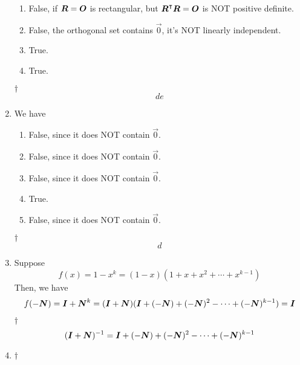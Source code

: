 \documentclass[a4paper,12pt]{article}
\begin{document}
\begin{enumerate}
\begin{enumerate}[label=(\alph*)]
        \item False, if $\boldsymbol{R} = \boldsymbol{O}$ is rectangular, but $\boldsymbol{R}^\intercal\boldsymbol{R} = \boldsymbol{O}$ is NOT positive definite.
        \item False, the orthogonal set contains $\vec{0}$, it's NOT linearly independent.
        \item True.
        \item True.
    \end{enumerate}
    \begin{answer}{$\dag$}\begin{equation}
            de       
        \end{equation}
    \end{answer}
    \item We have \begin{enumerate}[label=(\alph*)]
        \item False, since it does NOT contain $\vec{0}$.
        \item False, since it does NOT contain $\vec{0}$.
        \item False, since it does NOT contain $\vec{0}$.
        \item True.
        \item False, since it does NOT contain $\vec{0}$.
    \end{enumerate}
    \begin{answer}{$\dag$}\begin{equation}
            d        
        \end{equation}
    \end{answer}
    \item Suppose \begin{equation}
        f(x) = 1 - x^k = (1 - x)(1 + x + x^2 + \cdots + x^{k - 1})
    \end{equation} Then, we have \begin{equation}
        f(-\boldsymbol{N}) = \boldsymbol{I} + \boldsymbol{N}^k = (\boldsymbol{I} + \boldsymbol{N})(\boldsymbol{I} + (-\boldsymbol{N}) + (-\boldsymbol{N})^2 - \cdots + (-\boldsymbol{N})^{k - 1}) = \boldsymbol{I}
    \end{equation}
    \begin{answer}{$\dag$}\begin{equation}
            (\boldsymbol{I} + \boldsymbol{N})^{-1} = \boldsymbol{I} + (-\boldsymbol{N}) + (-\boldsymbol{N})^2 - \cdots + (-\boldsymbol{N})^{k - 1}
        \end{equation}
    \end{answer}
    \item \begin{answer}{$\dag$}\begin{equation}

\end{equation}
\end{answer}
\end{enumerate}
\end{document}
